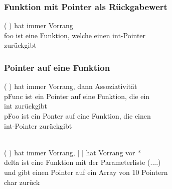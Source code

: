 	 	\subsubsection{Funktion mit Pointer als Rückgabewert}
	 		\begin{minipage}[t]{10 cm}
	 			\vspace*{-0.5cm}
	 			
	 		\end{minipage}
	 		\hspace*{0.5cm}
	 		\begin{minipage}[t]{10 cm}
	 			( ) hat immer Vorrang\\
	 			foo ist eine Funktion, welche einen int-Pointer\\ zurückgibt
	 		\end{minipage}
	 	\subsubsection{Pointer auf eine Funktion}
	 		\begin{minipage}[t]{10 cm}
	 			\vspace*{-0.5cm}
	 			
	 		\end{minipage}
	 		\hspace*{0.5cm}
	 		\begin{minipage}[t]{10 cm}
	 			( ) hat immer Vorrang, dann Assoziativität\\
	 			pFunc ist ein Pointer auf eine Funktion, die ein\\ int zurückgibt\\
	 			pFoo ist ein Ponter auf eine Funktion, die einen\\ int-Pointer zurückgibt\\\\
	 		\end{minipage}
	 		\begin{minipage}[t]{10 cm}
	 			\vspace*{-0.5cm}
	 			
	 		\end{minipage}
	 		\hspace*{0.5cm}
	 		\begin{minipage}[t]{10 cm}
	 			( ) hat immer Vorrang, [ ] hat Vorrang vor *\\
	 			delta ist eine Funktion mit der Parameterliste (....)\\ und gibt einen Pointer auf ein Array von 10 Pointern\\ char zurück
	 		\end{minipage}
